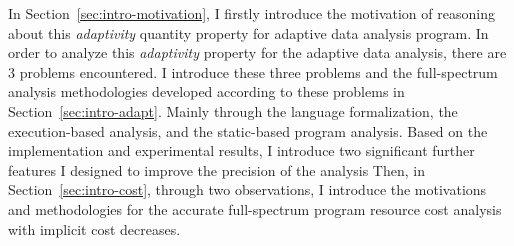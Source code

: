 In Section~\ref{sec:intro-motivation},
I firstly introduce the motivation of reasoning about this \emph{adaptivity} quantity property 
for adaptive data analysis program.
In order to analyze this \emph{adaptivity} property for the adaptive data analysis, there are 3 problems encountered.
I introduce these three problems
and the full-spectrum analysis methodologies developed according to these problems in Section~\ref{sec:intro-adapt}.
Mainly through the language formalization,
the execution-based analysis, and the static-based program analysis.
%
Based on the implementation and experimental results, I introduce two significant 
further features I designed to improve the precision of the analysis 
%
 Then, in Section~\ref{sec:intro-cost}, through two observations, I introduce the motivations and methodologies
 for the accurate full-spectrum program resource cost analysis with implicit cost decreases.
